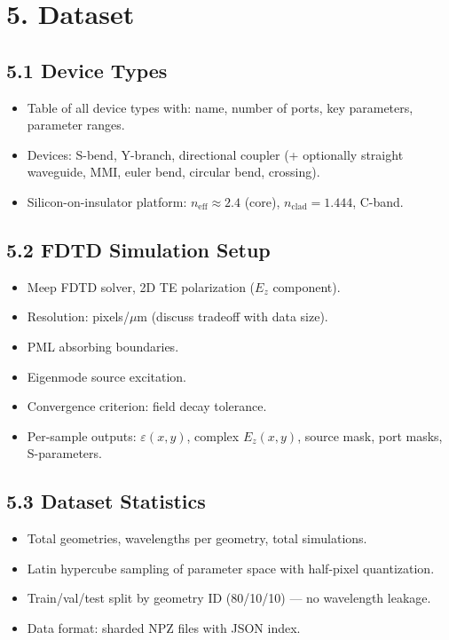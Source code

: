 \documentclass[11pt,letterpaper]{article}
\begin{document}
\section{5. Dataset}

\subsection{5.1 Device Types}
\begin{itemize}
    \item Table of all device types with: name, number of ports, key parameters, parameter ranges.
    \item Devices: S-bend, Y-branch, directional coupler (+ optionally straight waveguide, MMI, euler bend, circular bend, crossing).
    \item Silicon-on-insulator platform: $n_\text{eff} \approx 2.4$ (core), $n_\text{clad} = 1.444$, C-band.
\end{itemize}

\subsection{5.2 FDTD Simulation Setup}
\begin{itemize}
    \item Meep FDTD solver, 2D TE polarization ($E_z$ component).
    \item Resolution: pixels/$\mu$m (discuss tradeoff with data size).
    \item PML absorbing boundaries.
    \item Eigenmode source excitation.
    \item Convergence criterion: field decay tolerance.
    \item Per-sample outputs: $\varepsilon(x,y)$, complex $E_z(x,y)$, source mask, port masks, S-parameters.
\end{itemize}

\subsection{5.3 Dataset Statistics}
\begin{itemize}
    \item Total geometries, wavelengths per geometry, total simulations.
    \item Latin hypercube sampling of parameter space with half-pixel quantization.
    \item Train/val/test split by geometry ID (80/10/10) --- no wavelength leakage.
    \item Data format: sharded NPZ files with JSON index.
\end{itemize}
\end{document}
